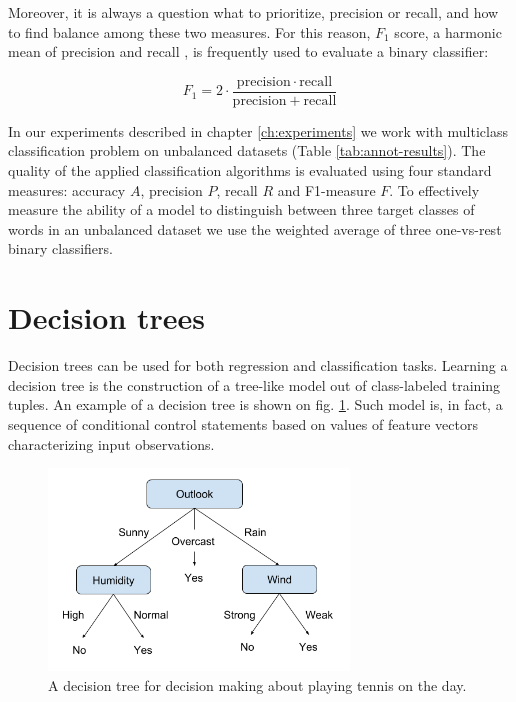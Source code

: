 Moreover, it is always a question what to prioritize, precision or recall, and how to find balance among these two measures. For this reason, $F_1$ score, a harmonic mean of precision and recall \citep{Chinchor-1992}, is frequently used to evaluate a binary classifier:

\begin{equation}
    F_{1}=2\cdot {\frac {\mathrm {precision} \cdot \mathrm {recall} }{\mathrm {precision} +\mathrm {recall} }}
\end{equation} 

In our experiments described in chapter \ref{ch:experiments} we work with multiclass classification problem on unbalanced datasets (Table \ref{tab:annot-results}). The quality of the applied classification algorithms is evaluated using four standard measures: accuracy $A$, precision $P$, recall $R$ and F1-measure $F$. To effectively measure the ability of a model to distinguish between three target classes of words in an unbalanced dataset we use the weighted average of three one-vs-rest binary classifiers. 


\section{Decision trees}
Decision trees can be used for both regression and classification tasks. Learning a decision tree is the construction of a tree-like model out of class-labeled training tuples. An example of a decision tree is shown on fig. \ref{fig:decision-tree}. Such model is, in fact, a sequence of conditional control statements based on values of feature vectors characterizing input observations. 

\begin{figure}[h]
    \centering
    \includegraphics[width=8cm]{Images/Decision-tree.png}
    \caption{A decision tree for decision making about playing tennis on the day.}
    \label{fig:decision-tree}
\end{figure}

